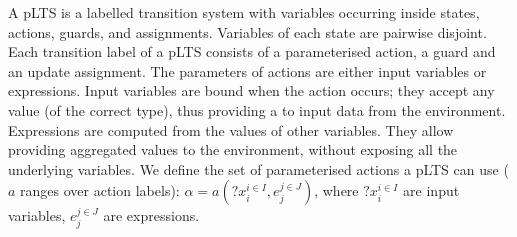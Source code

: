 \documentclass{llncs}
\newcommand{\newCoord}[1]{{\color{blue}#1}}
\begin{document}
A pLTS is a labelled transition system with variables occurring inside states,  actions, guards, and
assignments. 
Variables of each state are pairwise disjoint.
\newCoord{Each transition label of a pLTS consists of a parameterised action, a guard and an update assignment.  The parameters of actions are either input variables or expressions.  Input variables are bound when the action occurs; they accept any value (of the correct type), thus providing a to input data from the environment.  Expressions are computed from the values of other variables.  They allow providing aggregated values to the environment, without exposing all the underlying variables.}
We  define the set of parameterised actions a pLTS can use ($a$
ranges over action labels):
$\alpha=a(?x_i^{i \in I}, 
e_j^{j \in J})$, where $?x_i^{i \in I}$ are input variables, $e_j^{j \in J}$ 
are expressions.
\end{document}

